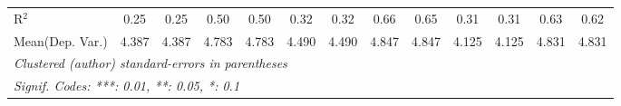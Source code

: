 \begin{tabular}{lcccccccccccc}
   R$^2$                                    & 0.25         & 0.25           & 0.50        & 0.50        & 0.32          & 0.32          & 0.66        & 0.65    & 0.31          & 0.31           & 0.63   & 0.62\\  
Mean(Dep. Var.) & 4.387 & 4.387 & 4.783 & 4.783 & 4.490 & 4.490 & 4.847 & 4.847 & 4.125 & 4.125 & 4.831 & 4.831 \\
   \midrule \midrule
   \multicolumn{13}{l}{\emph{Clustered (author) standard-errors in parentheses}}\\
   \multicolumn{13}{l}{\emph{Signif. Codes: ***: 0.01, **: 0.05, *: 0.1}}\\
\end{tabular}
\par\endgroup
